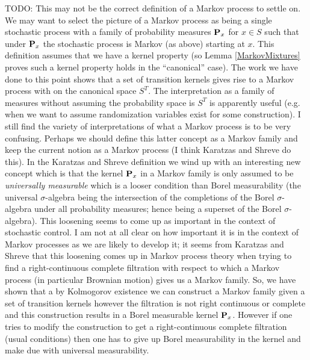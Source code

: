 TODO:  This may not be the correct definition of a Markov process to
settle on.   We may want to select the picture of a Markov process as
being a single stochastic process with a family of probability
measures $\textbf{P}_x$ for $x \in S$ such that under $\textbf{P}_x$ the
stochastic process is Markov (as above) starting at $x$.  This
definition assumes that we have a kernel property (so Lemma
\ref{MarkovMixtures} proves such a kernel property
holds in the ``canonical'' case).  The work we have done to this point
shows that a set of transition kernels gives rise to a Markov process
with on the canonical space $S^T$.  The interpretation as a family of measures
without assuming the probability space is $S^T$ is apparently useful (e.g. when we want to
assume randomization variables exist for some construction).  I still find the variety of
interpretations of what a Markov process is to be very confusing.
Perhaps we should define this latter concept as a Markov family and
keep the current notion as a Markov process (I think Karatzas and
Shreve do this).  In the Karatzas and Shreve definition we wind up
with an interesting new concept which is that the kernel
$\textbf{P}_x$ in a Markov family is only assumed to be \emph{universally measurable}
which is a looser condition than Borel measurability (the universal
$\sigma$-algebra being the intersection of the completions of the
Borel $\sigma$-algebra under all probability measures; hence being a
superset of the Borel $\sigma$-algebra).  This loosening
seems to come up as important in the context of stochastic control.  I
am not at all clear on how important it is in the context of Markov
processes as we are likely to develop it; it seems from Karatzas and
Shreve that this loosening comes up in Markov process theory when
trying to find a right-continuous complete filtration with respect to which a
Markov process (in particular Brownian motion) gives us a Markov
family.  So, we have shown that a by Kolmogorov existence we can
construct a Markov family given a set of transition kernels however
the filtration is not right continuous or complete and this
construction results in a Borel measurable kernel $\textbf{P}_x$.
However if one tries to modify the construction to get a
right-continuous complete filtration (usual conditions) then one has
to give up Borel measurability in the kernel and make due with
universal measurability.

